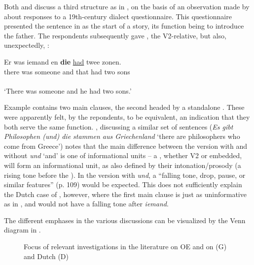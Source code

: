 \documentclass[output=paper,colorlinks,citecolor=brown]{langscibook}
\begin{document}
Both \citet{Gärtner2001} and \citet{DenDikken2003} discuss a third structure as in , on the basis of an observation made by \citet[6]{Zwart2003} about responses to a 19th-century dialect questionnaire. This questionnaire presented the sentence in  as the start of a story, its function being to introduce the father. The respondents subsequently gave , the V2-relative, but also, unexpectedly, :

\ea \label{ex:los:16}
\glll Er was iemand en \textbf{die} \underline{had} twee zonen.\\
 there was someone and that had two sons\\
[main clause + main clause ]\\
\glt ‘There was someone and he had two sons.' 
\z

Example  contains two main clauses, the second headed by a standalone . These were apparently felt, by the repondents, to be equivalent, an indication that they both serve the same function. \citet[109]{Gärtner2001}, discussing a similar set of sentences (\textit{Es gibt Philosophen (und) die stammen aus Griechenland} ‘there are philosophers who come from Greece') notes that the main difference between the version with and without \textit{und} ‘and' is one of informational units – a , whether V2 or embedded, will form an informational unit, as also defined by their intonation/prosody (a rising tone before the ). In the version with \textit{und}, a “falling tone, drop, pause, or similar features” (p. 109) would be expected. This does not sufficiently explain the Dutch case of , however, where the first main clause is just as uninformative as in , and would not have a falling tone after \textit{iemand}. 

The different emphases in the various discussions can be visualized by the Venn diagram in .

\begin{figure}

 \caption{Focus of relevant investigations in the literature on OE and on  (G) and Dutch (D)}
 \label{fig:los:1}
\end{figure}
 
\end{document}
